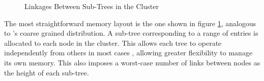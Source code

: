 \newcommand{\clusternode}[1]{
	\draw ({(#1)*6}, 0) ++(-2.75, 0.5) rectangle ++(5.5, -3);
	\node[tree] at ({(#1)*6}, 0) (n#1 00) {};
	\foreach \r [
		evaluate = \r as \w using int(3^\r),
		evaluate = \r as \wl using int(3^\r-1)
	] in {1,...,2} {
		\foreach \c [
			evaluate = \c as \i using int((\w-1)/2 + \c-1),
			evaluate = \c as \pr using int(\r-1),
			evaluate = \c as \pc using int(\c/3),
			evaluate = \c as \cl using int(\c-1)
		] in {0,...,\wl} {
			\node[tree] (n#1 \r\c)
				at ({(#1)*6 + (\c-int(\w/2)) / (\w/5)}, -\r) {};
			\draw[->] (n#1 \pr\pc) -- (n#1 \r\c);
			\ifthenelse{\c=0}{}{
				\draw[->] (n#1 \r\cl) -- (n#1 \r\c);
			}
		}
	}
}

\begin{figure}
	\centering
	\caption{Linkages Between Sub-Trees in the Cluster}
\label{coarse-link}
\end{figure}

The most straightforward memory layout is the one shown in figure
\ref{coarse-link}, analogous to \citeauthor{base}'s coarse grained distribution.
A sub-tree corresponding to a range of entries is allocated to each node in the
cluster. This allows each tree to operate independently from others in most
cases \autocite{ma-tpds-2022}, allowing greater flexibility to manage its own
memory. This also imposes a worst-case number of links between nodes as the
height of each sub-tree.

